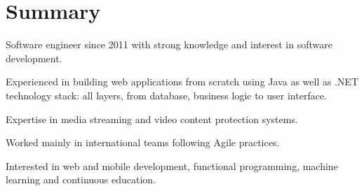 \section{Summary}

Software engineer since 2011 with strong knowledge and interest in software development.

Experienced in building web applications from scratch using Java as well as .NET technology stack:
all layers, from database, business logic to user interface.

Expertise in media streaming and video content protection systems.

Worked mainly in international teams following Agile practices.

Interested in web and mobile development, functional programming, machine learning and continuous education.
